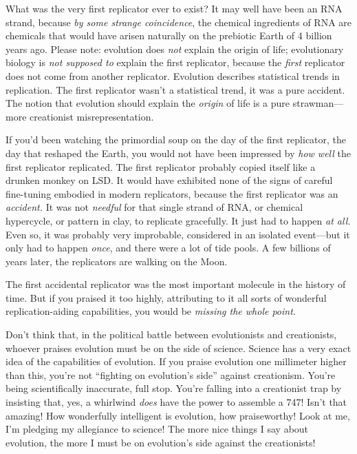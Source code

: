 {{
 What was the very first replicator ever to exist? It may well have
been an RNA strand, because \textit{by some strange coincidence}, the
chemical ingredients of RNA are chemicals that would have arisen
naturally on the prebiotic Earth of 4 billion years ago. Please note:
evolution does \textit{not} explain the origin of life; evolutionary
biology is \textit{not supposed to} explain the first replicator,
because the \textit{first} replicator does not come from another
replicator. Evolution describes statistical trends in replication. The
first replicator wasn't a statistical trend, it was a
pure accident. The notion that evolution should explain the
\textit{origin} of life is a pure strawman---more creationist
misrepresentation.}

{
 If you'd been watching the primordial soup on the
day of the first replicator, the day that reshaped the Earth, you would
not have been impressed by \textit{how well} the first replicator
replicated. The first replicator probably copied itself like a drunken
monkey on LSD. It would have exhibited none of the signs of careful
fine-tuning embodied in modern replicators, because the first
replicator was an \textit{accident.} It was not \textit{needful} for
that single strand of RNA, or chemical hypercycle, or pattern in clay,
to replicate gracefully. It just had to happen \textit{at all.} Even
so, it was probably very improbable, considered in an isolated
event---but it only had to happen \textit{once}, and there were a lot
of tide pools. A few billions of years later, the replicators are
walking on the Moon.}

{
 The first accidental replicator was the most important molecule in
the history of time. But if you praised it too highly, attributing to
it all sorts of wonderful replication-aiding capabilities, you would be
\textit{missing the whole point.}}

{
 Don't think that, in the political battle between
evolutionists and creationists, whoever praises evolution must be on
the side of science. Science has a very exact idea of the capabilities
of evolution. If you praise evolution one millimeter higher than this,
you're not ``fighting on
evolution's side'' against
creationism. You're being scientifically inaccurate,
full stop. You're falling into a creationist trap by
insisting that, yes, a whirlwind \textit{does} have the power to
assemble a 747! Isn't that amazing! How wonderfully
intelligent is evolution, how praiseworthy! Look at me,
I'm pledging my allegiance to science! The more nice
things I say about evolution, the more I must be on
evolution's side against the creationists!}

}

